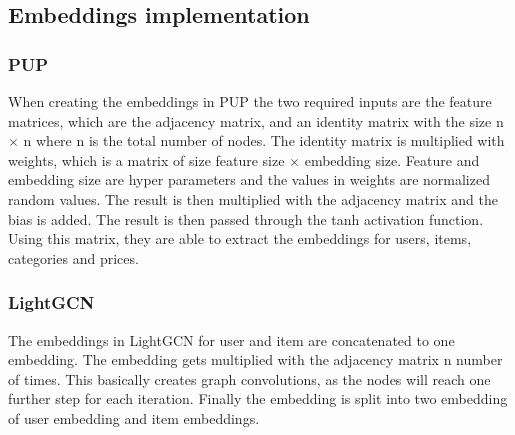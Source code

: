 \subsection{Embeddings implementation}
\subsubsection{PUP}
When creating the embeddings in PUP the two required inputs are the feature matrices, which are the adjacency matrix, and an identity matrix with the size n $\times$ n where n is the total number of nodes.
The identity matrix is multiplied with weights, which is a matrix of size feature size $\times$ embedding size.
Feature and embedding size are hyper parameters and the values in weights are normalized random values.
The result is then multiplied with the adjacency matrix and the bias is added.
The result is then passed through the tanh activation function.
Using this matrix, they are able to extract the embeddings for users, items, categories and prices.

\subsubsection{LightGCN}
The embeddings in LightGCN for user and item are concatenated to one embedding.
The embedding gets multiplied with the adjacency matrix n number of times.
This basically creates graph convolutions, as the nodes will reach one further step for each iteration.
Finally the embedding is split into two embedding of user embedding and item embeddings.
